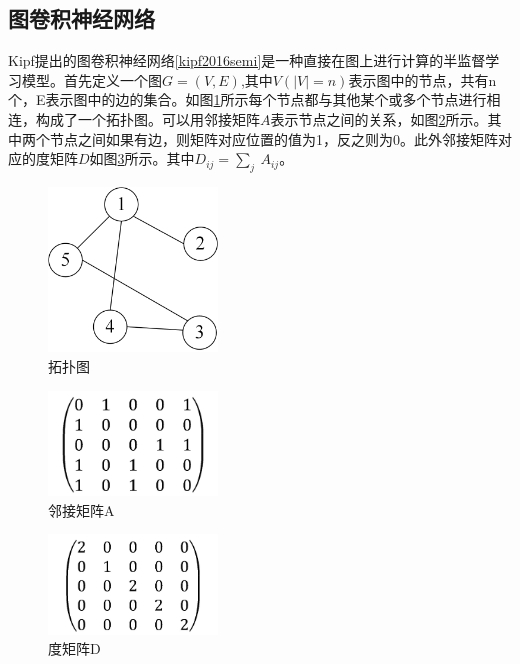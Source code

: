 \subsection{图卷积神经网络}
Kipf提出的图卷积神经网络\ref{kipf2016semi}是一种直接在图上进行计算的半监督学习模型。首先定义一个图$G=(V,E)$,其中$V\left(\left|V\right|=n\right)$表示图中的节点，共有n个，E表示图中的边的集合。如图\ref{topoFig}所示每个节点都与其他某个或多个节点进行相连，构成了一个拓扑图。可以用邻接矩阵$A$表示节点之间的关系，如图\ref{adjA}所示。其中两个节点之间如果有边，则矩阵对应位置的值为1，反之则为0。此外邻接矩阵对应的度矩阵$D$如图\ref{digD}所示。其中$D_{ij}=\sum_{j}\ A_{ij}$。
\begin{figure}[htb]%
	\setlength{\belowcaptionskip}{0pt}
	\centering
	\includegraphics[width=0.4\textwidth]{pic/2-6.png}
	\caption{拓扑图}
	\label{topoFig}
\end{figure}
\begin{figure}[htb]%
	\setlength{\belowcaptionskip}{0pt}
	\centering
	\includegraphics[width=0.4\textwidth]{pic/2-7.jpg}
	\caption{邻接矩阵A}
	\label{adjA}
\end{figure}
\begin{figure}[htb]%
	\setlength{\belowcaptionskip}{0pt}
	\centering
	\includegraphics[width=0.4\textwidth]{pic/2-8.jpg}
	\caption{度矩阵D}
	\label{digD}
\end{figure}

